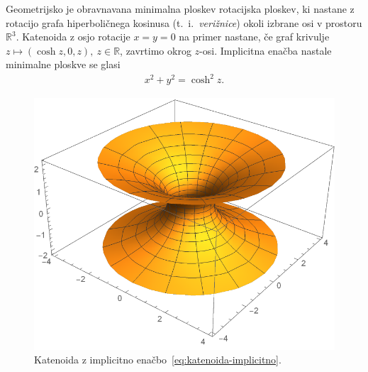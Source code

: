 \documentclass[12pt,a4paper,twoside]{article}
\theoremstyle{definition} %
\theoremstyle{plain} %
\numberwithin{equation}{section}  %
\begin{document}
Geometrijsko je obravnavana minimalna ploskev rotacijska ploskev, ki nastane z rotacijo grafa hiperboličnega kosinusa (t.~i.~\emph{verižnice}) okoli izbrane osi v prostoru $\mathbb{R}^3$. Katenoida z osjo rotacije $x=y=0$ na primer nastane, če graf krivulje $z \mapsto (\cosh z, 0, z), \ z \in \mathbb{R}$, zavrtimo okrog $z$-osi. Implicitna enačba nastale minimalne ploskve se glasi
\begin{gather} \label{eq:katenoida-implicitno}
x^2 + y^2 = \cosh ^2 z.
\end{gather}

\begin{figure}[h!]
\begin{center}
\includegraphics[scale=0.8]{images/catenoid.pdf}
\caption{Katenoida z implicitno enačbo~\ref{eq:katenoida-implicitno}.}
\end{center}
\end{figure}
\end{document}
